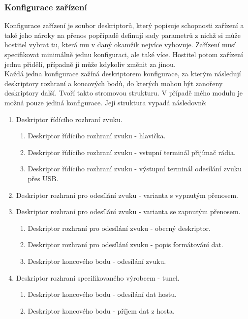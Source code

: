 \subsubsection{Konfigurace zařízení}
Konfigurace zařízení je soubor deskriptorů, který popisuje schopnosti zařízení a také jeho nároky na přenos popřípadě definují sady parametrů z nichž si může hostitel vybrat tu, která mu v daný okamžik nejvíce vyhovuje. Zařízení musí specifikovat minimálně jednu konfiguraci, ale také více. Hostitel potom zařízení jednu přidělí, případně ji může kdykoliv změnit za jinou.\\
Každá jedna konfigurace zažíná deskriptorem konfigurace, za kterým následují deskriptory rozhraní a koncových bodů, do kterých mohou být zanořeny deskriptory další. Tvoří takto stromovou strukturu. V případě mého modulu je možná pouze jediná konfigurace. Její struktura vypadá následovně:
\begin{enumerate}
\item Deskriptor řídícího rozhraní zvuku.
	\begin{enumerate}
	\item Deskriptor řídícího rozhraní zvuku - hlavička.
	\item Deskriptor řídícího rozhraní zvuku - vstupní terminál přijímač rádia.
	\item Deskriptor řídícího rozhraní zvuku - výstupní terminál odesílání zvuku přes USB.
	\end{enumerate}
\item Deskriptor rozhraní pro odesílání zvuku - varianta s vypnutým přenosem.
\item Deskriptor rozhraní pro odesílání zvuku - varianta se zapnutým přenosem.
	\begin{enumerate}
	\item Deskriptor rozhraní pro odesílání zvuku - obecný deskriptor.
	\item Deskriptor rozhraní pro odesílání zvuku - popis formátování dat.
	\item Deskriptor koncového bodu - odesílání zvuku.
	\end{enumerate}
\item Deskriptor rozhraní specifikovaného výrobcem - \iic tunel.
	\begin{enumerate}
	\item Deskriptor koncového bodu - odesílání dat hostu.
	\item Deskriptor koncového bodu - příjem dat z hosta.
	\end{enumerate}
\end{enumerate}


